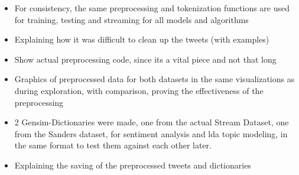 \begin{itemize}
    \item
    For consistency, the same preprocessing and tokenization functions are used for training, testing and streaming for all models and algorithms
    \item
    Explaining how it was difficult to clean up the tweets (with examples)
    \item
    Show actual preprocessing code, since its a vital piece and not that long
    \item
    Graphics of preprocessed data for both datasets in the same visualizations as during exploration, with comparison, proving the effectiveness of the preprocessing
    \item
    2 Gensim-Dictionaries were made, one from the actual Stream Dataset, one from the Sanders dataset, for sentiment analysis and lda topic modeling, in the same format to test them against each other later.
    \item
    Explaining the saving of the preprocessed tweets and dictionaries
\end{itemize}

